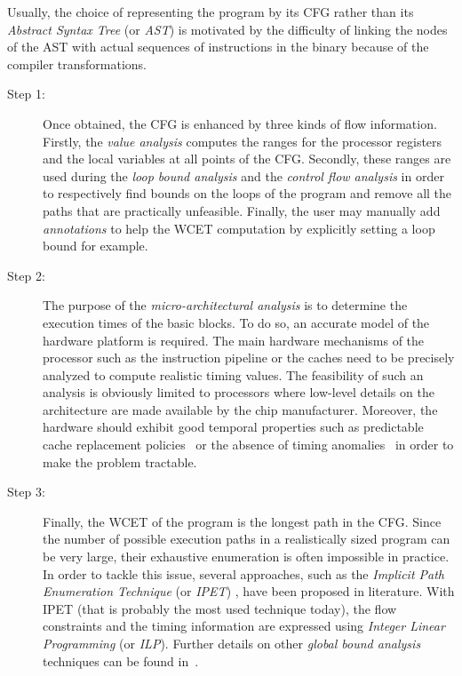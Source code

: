 \documentclass[main.tex]{subfiles}
\begin{document}
\begin{remark}
    Usually, the choice of representing the program by its CFG rather than its \emph{Abstract Syntax Tree} (or \emph{AST}) is motivated by the difficulty of linking the nodes of the AST with actual sequences of instructions in the binary because of the compiler transformations.
\end{remark}

\begin{description}
    \item[Step 1:]
Once obtained, the CFG is enhanced by three kinds of flow information. Firstly, the \emph{value analysis} computes the ranges for the processor registers and the local variables at all points of the CFG. Secondly, these ranges are used during the \emph{loop bound analysis} and the \emph{control flow analysis} in order to respectively find bounds on the loops of the program and remove all the paths that are practically unfeasible. Finally, the user may manually add \emph{annotations} to help the WCET computation by explicitly setting a loop bound for example.

    \item[Step 2:]
The purpose of the \emph{micro-architectural analysis} is to determine the execution times of the basic blocks. To do so, an accurate model of the hardware platform is required. The main hardware mechanisms of the processor such as the instruction pipeline or the caches need to be precisely analyzed to compute realistic timing values. The feasibility of such an analysis is obviously limited to processors where low-level details on the architecture are made available by the chip manufacturer. Moreover, the hardware should exhibit good temporal properties such as predictable cache replacement policies~\cite{Wilhelm2009} or the absence of timing anomalies~\cite{Lundqvist1999} in order to make the problem tractable. 

    \item[Step 3:]
        Finally, the WCET of the program is the longest path in the CFG. Since the number of possible execution paths in a realistically sized program can be very large, their exhaustive enumeration is often impossible in practice. In order to tackle this issue, several approaches, such as the \emph{Implicit Path Enumeration Technique} (or \emph{IPET}) \cite{Li1995}, have been proposed in literature. With IPET (that is probably the most used technique today), the flow constraints and the timing information are expressed using \emph{Integer Linear Programming} (or \emph{ILP}). Further details on other \emph{global bound analysis} techniques can be found in~\cite{Wilhelm2008}.
\end{description}
\end{document}
